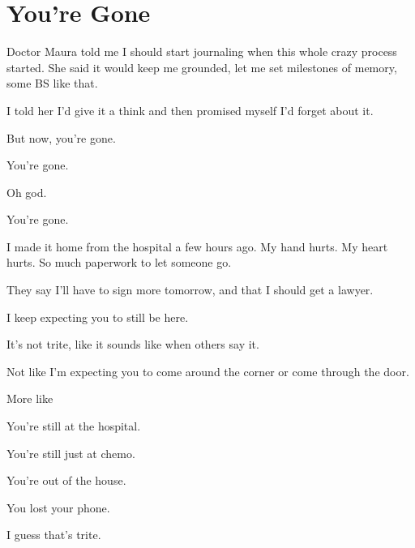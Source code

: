 \hypertarget{youre-gone}{%
\chapter{You’re Gone}\label{youre-gone}}

{
\setlength{\parindent}{0cm}
\setlength{\parskip}{5pt}

\nopagebreak

 Doctor Maura told me I should start journaling when this whole crazy process started. She said it would keep me grounded, let me set milestones of memory, some BS like that.

 I told her I'd give it a think and then promised myself I'd forget about it.

 But now, you're gone.

 You're gone.

 Oh god.

 You're gone.

\nopagebreak

 I made it home from the hospital a few hours ago. My hand hurts. My heart hurts. So much paperwork to let someone go.

 They say I'll have to sign more tomorrow, and that I should get a lawyer.

\nopagebreak

 I keep expecting you to still be here.

 It's not trite, like it sounds like when others say it.

 Not like I'm expecting you to come around the corner or come through the door.

 More like

 You're still at the hospital.

 You're still just at chemo.

 You're out of the house.

 You lost your phone.

 I guess that's trite.

}

